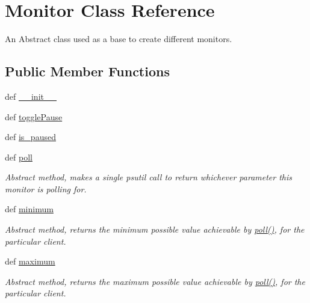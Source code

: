 \hypertarget{classsrc_1_1client_1_1_monitor_1_1_monitor}{\section{Monitor Class Reference}
\label{classsrc_1_1client_1_1_monitor_1_1_monitor}
}


An Abstract class used as a base to create different monitors.  


\subsection*{Public Member Functions}
\begin{DoxyCompactItemize}
\item 
def \hyperlink{classsrc_1_1client_1_1_monitor_1_1_monitor_ac775ee34451fdfa742b318538164070e}{\-\_\-\-\_\-init\-\_\-\-\_\-}
\item 
def \hyperlink{classsrc_1_1client_1_1_monitor_1_1_monitor_a0e0ee93ca3f230923c58fe95eb5d5126}{toggle\-Pause}
\item 
def \hyperlink{classsrc_1_1client_1_1_monitor_1_1_monitor_ab32012b1ca0c5f814dd17a92b48c08fe}{is\-\_\-paused}
\item 
def \hyperlink{classsrc_1_1client_1_1_monitor_1_1_monitor_a87cd0076a6d482a01482f25a64cf2fb4}{poll}
\begin{DoxyCompactList}\small\item\em Abstract method, makes a single psutil call to return whichever parameter this monitor is polling for. \end{DoxyCompactList}\item 
def \hyperlink{classsrc_1_1client_1_1_monitor_1_1_monitor_a4515aa6e0be4391413959391fef1109f}{minimum}
\begin{DoxyCompactList}\small\item\em Abstract method, returns the minimum possible value achievable by \hyperlink{classsrc_1_1client_1_1_monitor_1_1_monitor_a87cd0076a6d482a01482f25a64cf2fb4}{poll()}, for the particular client. \end{DoxyCompactList}\item 
def \hyperlink{classsrc_1_1client_1_1_monitor_1_1_monitor_a8f6589fdc9d322ec8e0dc2c7ede55ce9}{maximum}
\begin{DoxyCompactList}\small\item\em Abstract method, returns the maximum possible value achievable by \hyperlink{classsrc_1_1client_1_1_monitor_1_1_monitor_a87cd0076a6d482a01482f25a64cf2fb4}{poll()}, for the particular client. \end{DoxyCompactList}\end{DoxyCompactItemize}
